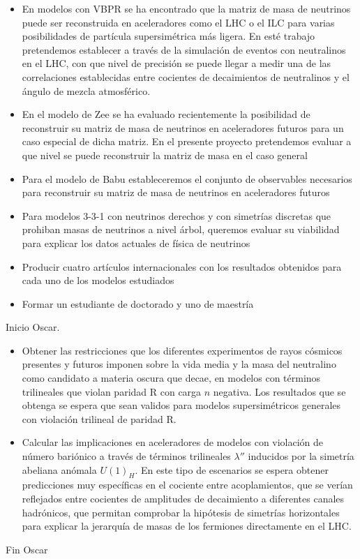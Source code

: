 \begin{ideas}
\begin{itemize}
\item En modelos con VBPR se ha encontrado que la matriz de masa de
  neutrinos puede ser reconstruida en aceleradores como el LHC o el
  ILC para varias posibilidades de partícula supersimétrica más
  ligera. En esté trabajo pretendemos establecer a través de la
  simulación de eventos con neutralinos en el LHC, con que nivel de
  precisión se puede llegar a medir una de las correlaciones
  establecidas entre cocientes de decaimientos de neutralinos y el
  ángulo de mezcla atmosférico.
\item En el modelo de Zee se ha evaluado recientemente la posibilidad
  de reconstruir su matriz de masa de neutrinos en aceleradores
  futuros para un caso especial de dicha matriz. En el presente
  proyecto pretendemos evaluar a que nivel se puede reconstruir la
  matriz de masa en el caso general
\item Para el modelo de Babu estableceremos el conjunto de observables
  necesarios para reconstruir su matriz de masa de neutrinos en
  aceleradores futuros
\item Para modelos 3-3-1 con neutrinos derechos y con simetrías
  discretas que prohiban masas de neutrinos a nivel árbol, queremos
  evaluar su viabilidad para explicar los datos actuales de
  física de neutrinos
\item Producir cuatro artículos internacionales con los resultados
  obtenidos para cada uno de los modelos estudiados
\item Formar un estudiante de doctorado y uno de maestría
\end{itemize}
Inicio Oscar.\\
\begin{itemize}
\item Obtener las restricciones que los diferentes experimentos de rayos cósmicos 
presentes y futuros imponen sobre la vida media y la masa del neutralino como 
candidato a materia oscura que decae, en modelos con términos trilineales 
que violan paridad R con carga $n$ negativa. Los resultados que se obtenga se 
espera que sean validos para modelos supersimétricos generales con violación trilineal de paridad R.

\item Calcular las implicaciones en aceleradores de modelos con violación 
de número bariónico a través de términos trilineales $\lambda''$ inducidos por la simetría 
abeliana anómala $U(1)_H$. En este tipo de escenarios se espera obtener 
predicciones muy específicas en el cociente entre acoplamientos, que se verían reflejados entre 
cocientes de amplitudes de decaimiento a diferentes canales hadrónicos, que permitan comprobar 
la hipótesis de simetrías horizontales para explicar la jerarquía de masas de los fermiones directamente en el LHC. 
\end{itemize}
Fin Oscar
\end{ideas}


